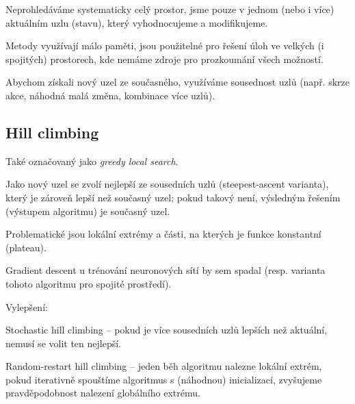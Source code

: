 \begin{compactitem}
    \item Neprohledáváme systematicky celý prostor, jsme pouze v jednom (nebo i více) aktuálním uzlu (stavu), který vyhodnocujeme a modifikujeme.

    \item Metody využívají málo paměti, jsou použitelné pro řešení úloh ve velkých (i spojitých) prostorech, kde nemáme zdroje pro prozkoumání všech možností.

    \item Abychom získali nový uzel ze současného, využíváme sousednost uzlů (např. skrze akce, náhodná malá změna, kombinace více uzlů).
\end{compactitem}

\subsection{Hill climbing}

\begin{compactitem}
    \item Také označovaný jako \textit{greedy local search}.

    \item Jako nový uzel se zvolí nejlepší ze sousedních uzlů (steepest-ascent varianta), který je zároveň lepší než současný uzel; pokud takový není, výsledným řešením (výstupem algoritmu) je současný uzel.

    \item Problematické jsou lokální extrémy a části, na kterých je funkce konstantní (plateau).

    \item Gradient descent u trénování neuronových sítí by sem spadal (resp. varianta tohoto algoritmu pro spojité prostředí).

    \item Vylepšení: \begin{compactitem}
        \item Stochastic hill climbing -- pokud je více sousedních uzlů lepších než aktuální, nemusí se volit ten nejlepší.

        \item Random-restart hill climbing -- jeden běh algoritmu nalezne lokální extrém, pokud iterativně spouštíme algoritmus s (náhodnou) inicializací, zvyšujeme pravděpodobnost nalezení globálního extrému.
    \end{compactitem}
\end{compactitem}

